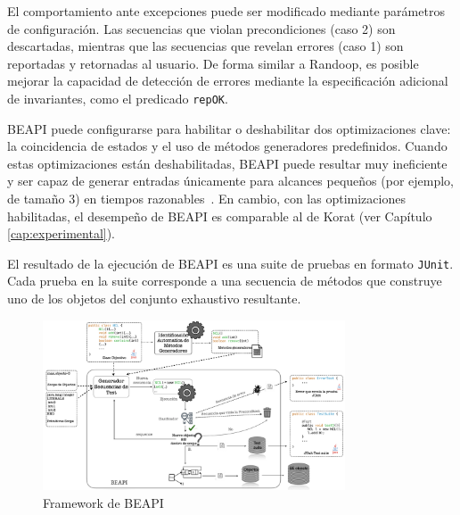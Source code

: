 El comportamiento ante excepciones puede ser modificado mediante parámetros de configuración. 
Las secuencias que violan precondiciones (caso 2) son descartadas, 
mientras que las secuencias que revelan errores (caso 1) 
son reportadas y retornadas al usuario. De forma similar a Randoop, 
es posible mejorar la capacidad de detección de errores mediante la especificación adicional de invariantes, 
como el predicado \texttt{repOK}.

BEAPI puede configurarse para habilitar o deshabilitar dos optimizaciones clave: 
la coincidencia de estados y el uso de métodos generadores predefinidos. 
Cuando estas optimizaciones están deshabilitadas, BEAPI puede resultar muy ineficiente 
y ser capaz de generar entradas únicamente para alcances pequeños (por ejemplo, de tamaño 3) en tiempos razonables~\cite{Politano20}. 
En cambio, con las optimizaciones habilitadas, el desempeño de BEAPI es comparable al de Korat (ver Capítulo \ref{cap:experimental}).

El resultado de la ejecución de BEAPI es una suite de pruebas en formato \texttt{JUnit}. 
Cada prueba en la suite corresponde a una secuencia de métodos que construye uno de los objetos del conjunto exhaustivo resultante.

\begin{figure}[H]
  \centering
  \includegraphics[width=0.8\textwidth]{images/beapi-arquitecture.jpeg}
  \caption{Framework de BEAPI}
  \label{fig:beapi-overview}
\end{figure}
